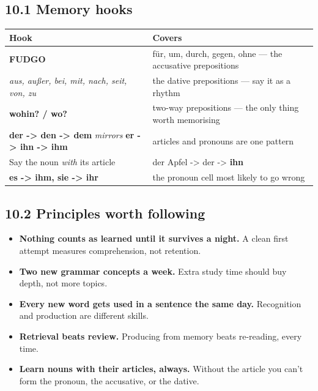 \documentclass[
  11pt,
]{article}
\newcounter{none} %
\providecommand{\tightlist}{%
  \setlength{\itemsep}{0pt}\setlength{\parskip}{0pt}}
\begin{document}
\subsection{10.1 Memory hooks}\label{memory-hooks}

{\def\LTcaptype{none} %
\begin{longtable}[]{@{}
  >{\raggedright\arraybackslash}p{}
  >{\raggedright\arraybackslash}p{}@{}}
\toprule\noalign{}
\begin{minipage}[b]{\linewidth}\raggedright
Hook
\end{minipage} & \begin{minipage}[b]{\linewidth}\raggedright
Covers
\end{minipage} \\
\midrule\noalign{}
\endhead
\bottomrule\noalign{}
\endlastfoot
\textbf{FUDGO} & für, um, durch, gegen, ohne --- the accusative
prepositions \\
\emph{aus, außer, bei, mit, nach, seit, von, zu} & the dative
prepositions --- say it as a rhythm \\
\textbf{wohin? / wo?} & two-way prepositions --- the only thing worth
memorising \\
\textbf{der -\textgreater{} den -\textgreater{} dem} \emph{mirrors}
\textbf{er -\textgreater{} ihn -\textgreater{} ihm} & articles and
pronouns are one pattern \\
Say the noun \emph{with} its article & der Apfel -\textgreater{} der
-\textgreater{} \textbf{ihn} \\
\textbf{es -\textgreater{} ihm, sie -\textgreater{} ihr} & the pronoun
cell most likely to go wrong \\
\end{longtable}
}

\subsection{10.2 Principles worth
following}\label{principles-worth-following}

\begin{itemize}
\tightlist
\item
  \textbf{Nothing counts as learned until it survives a night.} A clean
  first attempt measures comprehension, not retention.
\item
  \textbf{Two new grammar concepts a week.} Extra study time should buy
  depth, not more topics.
\item
  \textbf{Every new word gets used in a sentence the same day.}
  Recognition and production are different skills.
\item
  \textbf{Retrieval beats review.} Producing from memory beats
  re-reading, every time.
\item
  \textbf{Learn nouns with their articles, always.} Without the article
  you can't form the pronoun, the accusative, or the dative.
\end{itemize}
\end{document}
